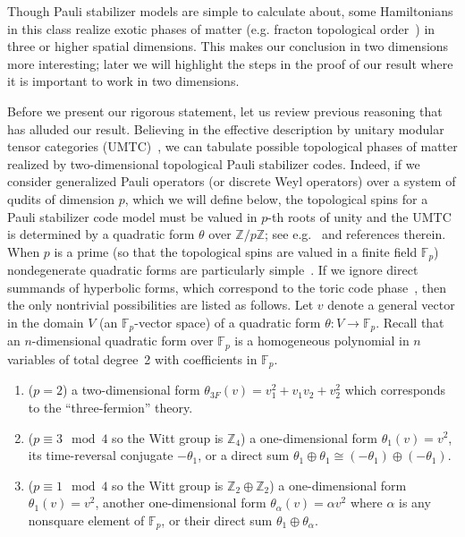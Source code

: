 \documentclass[aps,pra,
floatfix,notitlepage,
nofootinbib,
longbibliography,11pt]{revtex4-1}
\theoremstyle{definition}
\newcommand{\ZZ}{{\mathbb{Z}}}
\newcommand{\FF}{{\mathbb{F}}}
\begin{document}
Though Pauli stabilizer models are simple to calculate about,
some Hamiltonians in this class realize exotic phases of matter 
(e.g. fracton topological order~\cite{VHF2016})
in three or higher spatial dimensions.
This makes our conclusion in two dimensions more interesting;
later we will highlight the steps in the proof of our result 
where it is important to work in two dimensions.

Before we present our rigorous statement,
let us review previous reasoning that has alluded our result.
Believing in the effective description by unitary modular tensor categories (UMTC)~\cite{BakalovKirillov2001,Kitaev_2005},
we can tabulate possible topological phases of matter 
realized by two-dimensional topological Pauli stabilizer codes.
Indeed, if we consider generalized Pauli operators (or discrete Weyl operators)
over a system of qudits of dimension $p$, which we will define below,
the topological spins for a Pauli stabilizer code model must be valued in $p$-th roots of unity
and the UMTC is determined by a quadratic form $\theta$ over $\ZZ/p\ZZ$; 
see e.g.~\cite[\S 5]{Galindo2016} and references therein.
When $p$ is a prime (so that the topological spins are valued in a finite field $\FF_p$)
nondegenerate quadratic forms are particularly simple~\cite{Lam,Kniga}.
If we ignore direct summands of hyperbolic forms, 
which correspond to the toric code phase~\cite{Kitaev_2003},
then the only nontrivial possibilities are listed as follows.
Let $v$ denote a general vector in the domain $V$ (an $\FF_p$-vector space)
of a quadratic form $\theta: V \to \FF_p$.
Recall that an $n$-dimensional quadratic form over $\FF_p$ 
is a homogeneous polynomial in $n$ variables of total degree~2
with coefficients in $\FF_p$.

\begin{enumerate}
\item ($p=2$) a two-dimensional form $\theta_{3F}(v) = v_1^2 + v_1 v_2 + v_2^2$
which corresponds to the ``three-fermion'' theory.
\item ($p \equiv 3 \mod 4$ so the Witt group is $\ZZ_4$) 
a one-dimensional form $\theta_1(v) = v^2$,
its time-reversal conjugate $-\theta_1$, 
or a direct sum $\theta_1 \oplus \theta_1 \cong (-\theta_1) \oplus (-\theta_1)$.
\item ($p \equiv 1 \mod 4$ so the Witt group is $\ZZ_2 \oplus \ZZ_2$)
a one-dimensional form $\theta_1(v) = v^2$,
another one-dimensional form $\theta_{\alpha}(v) = \alpha v^2$ where $\alpha$ is any nonsquare element of $\FF_p$,
or their direct sum $\theta_1 \oplus \theta_\alpha$.
\end{enumerate}
\end{document}
